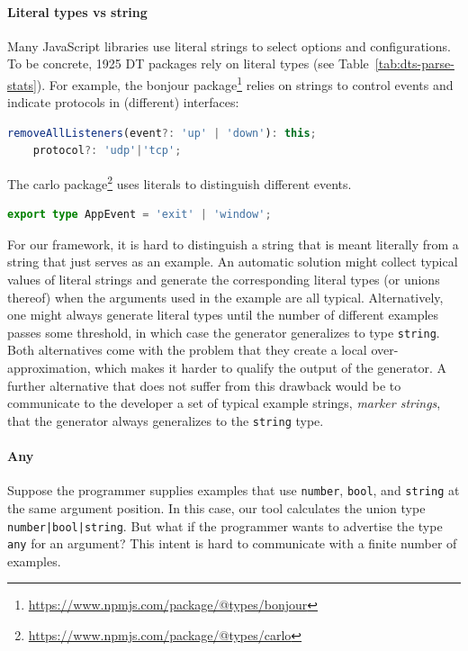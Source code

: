 \documentclass[sigplan,screen]{acmart}
\begin{document}
\paragraph*{Literal types vs string}
Many JavaScript libraries use literal strings to select
options and configurations. To be concrete, 1925 DT packages rely on
literal types (see Table~\ref{tab:dts-parse-stats}). For example, the bonjour
package\footnote{\url{https://www.npmjs.com/package/@types/bonjour}}
relies on strings to control events and indicate protocols in (different) interfaces:
\begin{lstlisting}[language=TypeScript]
    removeAllListeners(event?: 'up' | 'down'): this;
    protocol?: 'udp'|'tcp';
\end{lstlisting}
The carlo
package\footnote{\url{https://www.npmjs.com/package/@types/carlo}}
uses literals to distinguish different events.
\begin{lstlisting}[language=TypeScript]
export type AppEvent = 'exit' | 'window';
\end{lstlisting}

For our framework, it is hard to distinguish a string that is meant literally from a
string that just serves as an example. An automatic solution might collect
typical values of literal strings and generate the corresponding literal types (or
unions thereof) when the arguments used in the example are all typical. Alternatively, one
might always generate literal types until the number of different
examples passes some threshold, in which case the generator
generalizes to type 
\lstinline/string/. Both alternatives come with the problem that they
create a local over-approximation, which makes it harder to
qualify the output of the generator. A further alternative that does
not suffer from this drawback would be to communicate to the developer a set
of typical example strings, \emph{marker strings}, that the generator
always generalizes to the \lstinline/string/ type.

\paragraph*{Any}
Suppose the programmer supplies examples that use \lstinline/number/, \lstinline/bool/, and
\lstinline/string/ at the same argument position. In this case, our
tool calculates the union type \lstinline/number|bool|string/. But what if the programmer
wants to advertise the type \lstinline/any/ for an argument? This intent is hard to
communicate with a finite number of examples.
\end{document}
